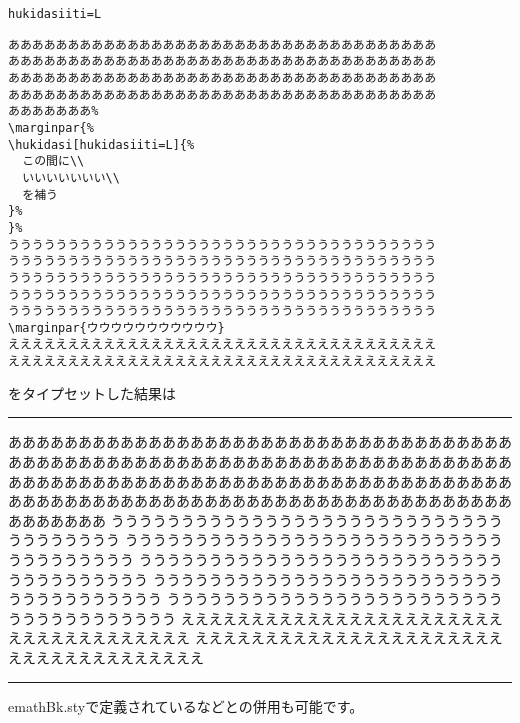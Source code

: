 \begin{itembox}{\texttt{hukidasiiti=L}}
\begin{verbatim}
ああああああああああああああああああああああああああああああああああああ
ああああああああああああああああああああああああああああああああああああ
ああああああああああああああああああああああああああああああああああああ
ああああああああああああああああああああああああああああああああああああ
あああああああ%
\marginpar{%
\hukidasi[hukidasiiti=L]{%
  この間に\\
  いいいいいいい\\
  を補う
}%
}%
うううううううううううううううううううううううううううううううううううう
うううううううううううううううううううううううううううううううううううう
うううううううううううううううううううううううううううううううううううう
うううううううううううううううううううううううううううううううううううう
うううううううううううううううううううううううううううううううううううう
\marginpar{ウウウウウウウウウウウ}
ええええええええええええええええええええええええええええええええええええ
ええええええええええええええええええええええええええええええええええええ
\end{verbatim}
\end{itembox}
をタイプセットした結果は\smallskip
\hrule\smallskip
ああああああああああああああああああああああああああああああああああああ
ああああああああああああああああああああああああああああああああああああ
ああああああああああああああああああああああああああああああああああああ
ああああああああああああああああああああああああああああああああああああ
あああああああ%
%
うううううううううううううううううううううううううううううううううううう
うううううううううううううううううううううううううううううううううううう
うううううううううううううううううううううううううううううううううううう
うううううううううううううううううううううううううううううううううううう
うううううううううううううううううううううううううううううううううううう
ええええええええええええええええええええええええええええええええええええ
ええええええええええええええええええええええええええええええええええええ
\smallskip\hrule\bigskip

\textsf{emathBk.sty}で定義されているなどとの併用も可能です。

